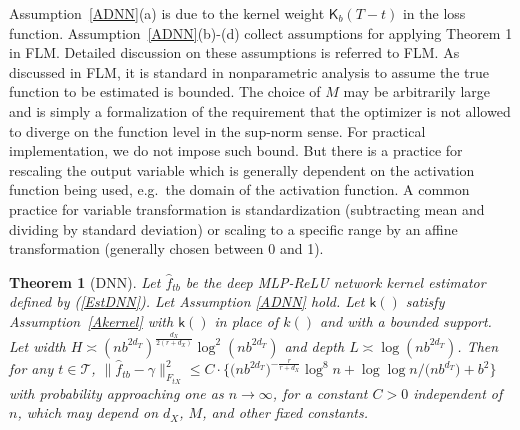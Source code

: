 \documentclass[lettersize, 12pt]{article}
\newtheorem{theorem}{Theorem}
\begin{document}
Assumption~\ref{ADNN}(a) is due to the kernel weight $\mathsf{K}_b(T-t)$ in the loss function.
Assumption~\ref{ADNN}(b)-(d) collect assumptions for applying Theorem 1 in FLM.
Detailed discussion on these assumptions is referred to FLM.
As discussed in FLM, it is standard in nonparametric analysis to assume the true function to be estimated is bounded. 
The choice of $M$ may be arbitrarily large and is simply a formalization of the requirement that the optimizer is not allowed to diverge on the function level in the sup-norm sense. 
For practical implementation, we do not impose such bound.
But there is a practice for rescaling the output variable which is generally dependent on the activation function being used, e.g.\ the domain of the activation function.
A common practice for variable transformation is standardization (subtracting mean and dividing by standard deviation) or scaling to a specific range by an affine transformation (generally chosen between 0 and 1). 



\begin{theorem}[DNN]
Let $\hat f_{tb}$ be the deep MLP-ReLU network kernel estimator defined by (\ref{EstDNN}).
Let Assumption \ref{ADNN} hold.
Let $\mathsf{k}()$ satisfy Assumption~\ref{Akernel} with $\mathsf{k}()$ in place of $k()$ and with a bounded support.
Let width $H \asymp (nb^{2d_T})^{\frac{{d_X}}{2(r+{d_X})}}\log^2(nb^{2d_T})$ and depth $L\asymp \log (nb^{2d_T})$.
Then for any $t\in\mathcal{T}$,
$\|\hat f_{tb} - \gamma\|_{F_{tX}}^2 \leq C\cdot\Big\{ \big(nb^{2d_T}\big)^{-\frac{r}{r+d_X}}\log^8n  +\log\log n/\big(nb^{d_T}\big) + b^2\Big\}$ with probability approaching one as $n\rightarrow\infty$,
for a constant $C > 0$ independent of $n$, which may depend on $d_X$, $M$, and other fixed constants.
\label{TDNN}
\end{theorem}
\end{document}
